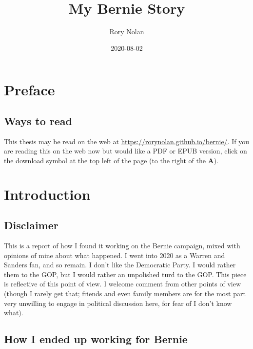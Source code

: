 \documentclass[]{book}
\title{My Bernie Story}
\author{Rory Nolan}
\date{2020-08-02}
\begin{document}
\maketitle

{
\setcounter{tocdepth}{1}
\tableofcontents
}
\hypertarget{preface}{%
\chapter*{Preface}\label{preface}}

\hypertarget{ways-to-read}{%
\section*{Ways to read}\label{ways-to-read}}

This thesis may be read on the web at \url{https://rorynolan.github.io/bernie/}. If you are reading this on the web now but would like a PDF or EPUB version, click on the download symbol at the top left of the page (to the right of the \textbf{A}).

\hypertarget{intro}{%
\chapter{Introduction}\label{intro}}

\hypertarget{disclaimer}{%
\section{Disclaimer}\label{disclaimer}}

This is a report of how I found it working on the Bernie campaign, mixed with opinions of mine about what happened. I went into 2020 as a Warren and Sanders fan, and so remain. I don't like the Democratic Party. I would rather them to the GOP, but I would rather an unpolished turd to the GOP. This piece is reflective of this point of view. I welcome comment from other points of view (though I rarely get that; friends and even family members are for the most part very unwilling to engage in political discussion here, for fear of I don't know what).

\hypertarget{how-i-ended-up-working-for-bernie}{%
\section{How I ended up working for Bernie}\label{how-i-ended-up-working-for-bernie}}
\end{document}
